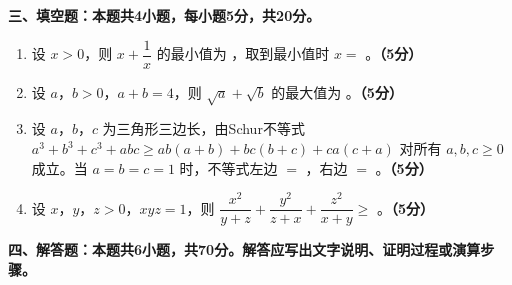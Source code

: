 \documentclass[12pt, a4paper]{ctexart}
\newcommand{\score}[1]{\hfill\textbf{（#1分）}}
\begin{document}
\vspace{10pt}

{\large\bfseries 三、填空题：本题共4小题，每小题5分，共20分。}

\vspace{8pt}

\begin{enumerate}[resume]

\item 设 $x>0$，则 $x+\dfrac{1}{x}$ 的最小值为 \underline{\hspace{2cm}}，取到最小值时 $x=$ \underline{\hspace{2cm}}。\score{5}

\item 设 $a$，$b>0$，$a+b=4$，则 $\sqrt{a}+\sqrt{b}$ 的最大值为 \underline{\hspace{2cm}}。\score{5}

\item 设 $a$，$b$，$c$ 为三角形三边长，由Schur不等式 $a^3+b^3+c^3+abc\geq ab(a+b)+bc(b+c)+ca(c+a)$ 对所有 $a,b,c\geq 0$ 成立。当 $a=b=c=1$ 时，不等式左边 $=$ \underline{\hspace{2cm}}，右边 $=$ \underline{\hspace{2cm}}。\score{5}

\item 设 $x$，$y$，$z>0$，$xyz=1$，则 $\dfrac{x^2}{y+z}+\dfrac{y^2}{z+x}+\dfrac{z^2}{x+y}\geq$ \underline{\hspace{2cm}}。\score{5}

\end{enumerate}

\vspace{10pt}

{\large\bfseries 四、解答题：本题共6小题，共70分。解答应写出文字说明、证明过程或演算步骤。}

\vspace{8pt}
\end{document}

